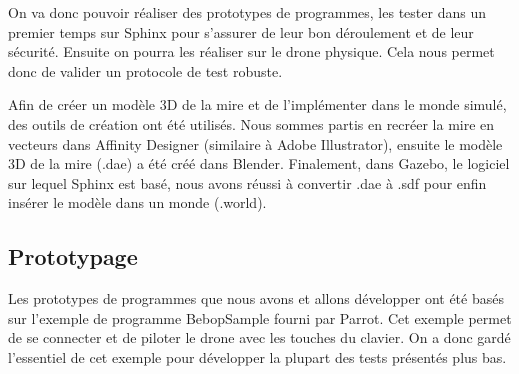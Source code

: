 \documentclass[12pt]{article}
\begin{document}
On va donc pouvoir réaliser des prototypes de programmes, les tester dans un premier temps sur Sphinx pour s'assurer de leur bon déroulement et de leur sécurité.
Ensuite on pourra les réaliser sur le drone physique. Cela nous permet donc de valider un protocole de test robuste.

Afin de créer un modèle 3D de la mire et de l'implémenter dans le monde simulé, des outils de création ont été utilisés. Nous sommes partis en recréer la mire en vecteurs dans Affinity Designer (similaire à Adobe Illustrator), ensuite le modèle 3D de la mire (.dae) a été créé dans Blender. Finalement, dans Gazebo, le logiciel sur lequel Sphinx est basé, nous avons réussi à convertir .dae à .sdf pour enfin insérer le modèle dans un monde (.world).


\subsection{Prototypage\label{proto}}
Les prototypes de programmes que nous avons et allons développer ont été basés sur l'exemple de programme BebopSample \cite{bebopsample} fourni par Parrot. Cet exemple permet de se connecter et de piloter le drone avec les touches du clavier. On a donc gardé l'essentiel de cet exemple pour développer la plupart des tests présentés plus bas.
\end{document}
